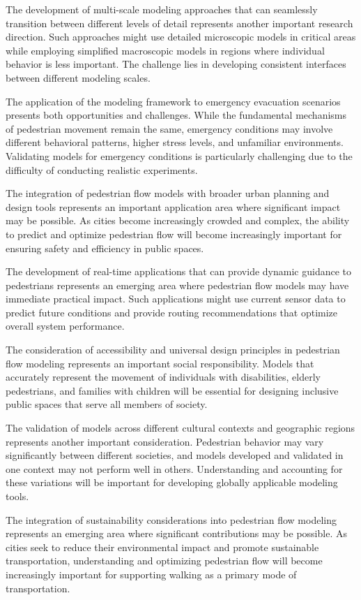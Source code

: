 \documentclass[12pt,a4paper]{article}
\begin{document}
The development of multi-scale modeling approaches that can seamlessly transition between different levels of detail represents another important research direction. Such approaches might use detailed microscopic models in critical areas while employing simplified macroscopic models in regions where individual behavior is less important. The challenge lies in developing consistent interfaces between different modeling scales.

The application of the modeling framework to emergency evacuation scenarios presents both opportunities and challenges. While the fundamental mechanisms of pedestrian movement remain the same, emergency conditions may involve different behavioral patterns, higher stress levels, and unfamiliar environments. Validating models for emergency conditions is particularly challenging due to the difficulty of conducting realistic experiments.

The integration of pedestrian flow models with broader urban planning and design tools represents an important application area where significant impact may be possible. As cities become increasingly crowded and complex, the ability to predict and optimize pedestrian flow will become increasingly important for ensuring safety and efficiency in public spaces.

The development of real-time applications that can provide dynamic guidance to pedestrians represents an emerging area where pedestrian flow models may have immediate practical impact. Such applications might use current sensor data to predict future conditions and provide routing recommendations that optimize overall system performance.

The consideration of accessibility and universal design principles in pedestrian flow modeling represents an important social responsibility. Models that accurately represent the movement of individuals with disabilities, elderly pedestrians, and families with children will be essential for designing inclusive public spaces that serve all members of society.

The validation of models across different cultural contexts and geographic regions represents another important consideration. Pedestrian behavior may vary significantly between different societies, and models developed and validated in one context may not perform well in others. Understanding and accounting for these variations will be important for developing globally applicable modeling tools.

The integration of sustainability considerations into pedestrian flow modeling represents an emerging area where significant contributions may be possible. As cities seek to reduce their environmental impact and promote sustainable transportation, understanding and optimizing pedestrian flow will become increasingly important for supporting walking as a primary mode of transportation.
\end{document}
